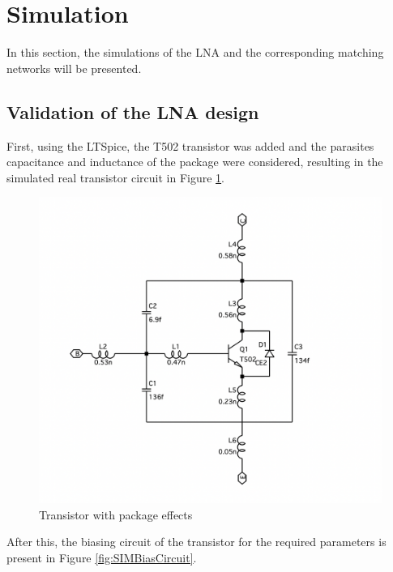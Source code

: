 \section{Simulation}

In this section, the simulations of the LNA and the corresponding matching networks will be presented.

\subsection{Validation of the LNA design}

First, using the LTSpice, the T502 transistor was added and the parasites capacitance and inductance of the package were considered, resulting in the simulated real transistor circuit in Figure \ref{fig:TransistorReal}.

\begin{figure}[H]
    \centering
    \includegraphics*[scale = 0.3]{Images/TransistorReal.png}
    \caption{Transistor with package effects}
    \label{fig:TransistorReal}
\end{figure}

After this, the biasing circuit of the transistor for the required  parameters is present in Figure \ref{fig:SIMBiasCircuit}.

